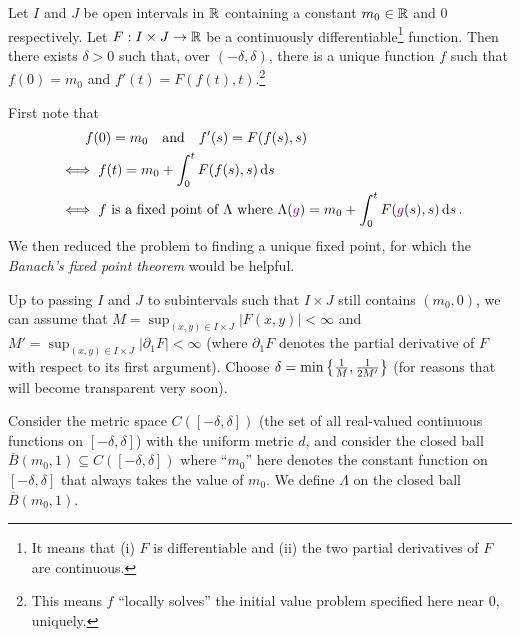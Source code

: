 \begin{enumerate}
\begin{theorem}
\label{thm:picard-lindelof}
Let \(I\) and \(J\) be open intervals in \(\mathbb{R}\) containing a constant
\(m_0\in\mathbb{R}\) and \(0\) respectively.  Let \(F:I\times J\to\mathbb{R}\) be a
continuously differentiable\footnote{It means that (i) \(F\) is differentiable
and (ii) the two partial derivatives of \(F\) are continuous.} function. Then
there exists \(\delta>0\) such that, over \((-\delta,\delta)\), there is a
unique function \(f\) such that \(f(0)=m_0\) and
\(f'(t)=F(f(t),t)\).\footnote{This means \(f\) ``locally solves'' the initial value
problem specified here near \(0\), uniquely.}
\begin{center}
\end{center}
\end{theorem}
\begin{pf}
First note that
\begin{align*}
&\qquad f(0)=m_0\qqtext{and}f'(s)=F(f(s),s) \\
&\iff f(t)=m_0+\int_{0}^{t}F(f(s),s)\dd{s} \\
&\iff f \text{ is a fixed point of }\Lambda\text{ where
}\Lambda(\vc{g})=m_0+\int_{0}^{t}F(\vc{g}(s),s)\dd{s}.
\end{align*}
We then reduced the problem to finding a unique fixed point, for which the
\emph{Banach's fixed point theorem} would be helpful.

Up to passing \(I\) and \(J\) to subintervals such that \(I\times J\) still
contains \((m_0,0)\), we can assume that \(M=\sup_{(x,y)\in I\times
J}|F(x,y)|<\infty\) and \(M'=\sup_{(x,y)\in I\times J}|\partial_1 F|<\infty\)
(where \(\partial_1 F\) denotes the partial derivative of \(F\) with respect to
its first argument). Choose \(
\delta=\min\qty{\frac{1}{M},\frac{1}{2M'}}\) (for reasons that will become
transparent very soon).

Consider the metric space \(C([-\delta,\delta])\) (the set of all real-valued
continuous functions on \([-\delta,\delta]\)) with the uniform metric \(d\),
and consider the closed ball \(\overline{B}(m_0,1)\subseteq
C([-\delta,\delta])\) where ``\(m_0\)'' here denotes the constant function on
\([-\delta,\delta]\) that always takes the value of \(m_0\). We define
\(\Lambda\) on the closed ball \(\overline{B}(m_0,1)\).


\end{pf}
\end{enumerate}
